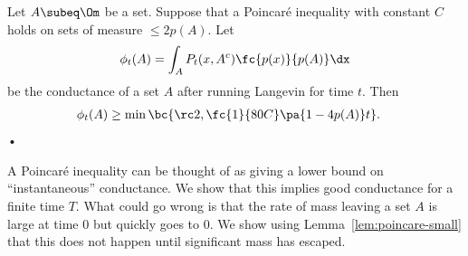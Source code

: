 
\begin{lem}\label{lem:sse}
Let $A\subeq \Om$ be a set.
Suppose that a Poincar\'e inequality with constant $C$ holds on sets of measure $\le 2p(A)$.
Let 
$$\phi_t(A) = \int_A%
P_t(x,A^c)
 \fc{p(x)}{p(A)}\dx$$
be the conductance of a set $A$ after running Langevin for time $t$. %
Then
\begin{align}
\phi_t(A) &\ge \min\bc{\rc 2, \fc{1}{80C}\pa{1-4p(A)}t}.
\end{align}•
\end{lem}
A Poincar\'e inequality can be thought of as giving a lower bound on ``instantaneous'' conductance. We show that this implies good conductance for a finite time $T$. What could go wrong is that the rate of mass leaving a set $A$ is large at time 0 but quickly goes to 0. We show using Lemma~\ref{lem:poincare-small} that this does not happen until significant mass has escaped.
